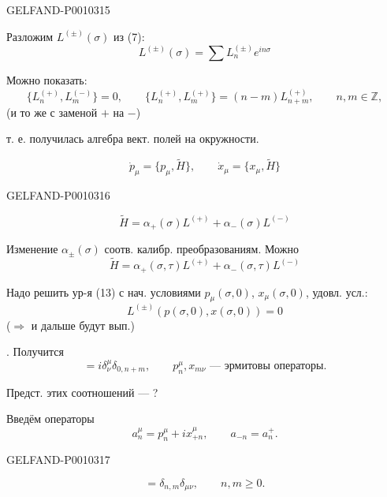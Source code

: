 \begin{GelfandAdjacentEvidence}{GELFAND-P001031}{5}


Разложим $L^{(\pm)}(\sigma)$ из (7):
\begin{equation*}
L^{(\pm)}(\sigma)=\sum L_n^{(\pm)}e^{in\sigma}
\tag{11}
\end{equation*}

Можно показать:
\begin{equation*}
\{L_n^{(+)},L_m^{(-)}\}=0,\qquad
\{L_n^{(+)},L_m^{(+)}\}=(n-m)L_{n+m}^{(+)},\qquad n,m\in\mathbb Z,
\tag{12}
\end{equation*}
(и то же с заменой $+$ на $-$)

т. е. получилась алгебра вект. полей на окружности.

\begin{equation*}
\dot{p}_\mu=\{p_\mu,\widetilde H\},\qquad
\dot{x}_\mu=\{x_\mu,\widetilde H\}
\tag{13}
\end{equation*}
\end{GelfandAdjacentEvidence}
\begin{GelfandAdjacentEvidence}{GELFAND-P001031}{6}


\begin{equation*}
\widetilde H=\alpha_+(\sigma)L^{(+)}+\alpha_-(\sigma)L^{(-)}
\tag{14}
\end{equation*}

Изменение $\alpha_\pm(\sigma)$ соотв. калибр. преобразованиям. Можно
\begin{equation*}
\widetilde H=\alpha_+(\sigma,\tau)L^{(+)}+\alpha_-(\sigma,\tau)L^{(-)}
\tag{14'}
\end{equation*}

Надо решить ур-я (13) с нач. условиями $p_\mu(\sigma,0)$, $x_\mu(\sigma,0)$,
удовл. усл.:
\begin{equation*}
L^{(\pm)}(p(\sigma,0),x(\sigma,0))=0
\tag{15}
\end{equation*}
($\Rightarrow$ и дальше будут вып.)

. Получится
\begin{equation*}
[p^\mu_n,x_{m\nu}]=i\delta^\mu_\nu\delta_{0,n+m},\qquad
p^\mu_n,x_{m\nu}\text{ --- эрмитовы операторы}.
\tag{16}
\end{equation*}

Предст. этих соотношений --- ?

Введём операторы
\begin{equation*}
a_n^\mu=p_n^\mu+i x_{+n}^\mu,\qquad a_{-n}=a_n^+.
\tag{17}
\end{equation*}
\end{GelfandAdjacentEvidence}
\begin{GelfandAdjacentEvidence}{GELFAND-P001031}{7}


\begin{equation*}
[a_n^\mu,a_n^{+\nu}]=\delta_{n,m}\delta_{\mu\nu},\qquad n,m\geq0.
\tag{18}
\end{equation*}
\end{GelfandAdjacentEvidence}


